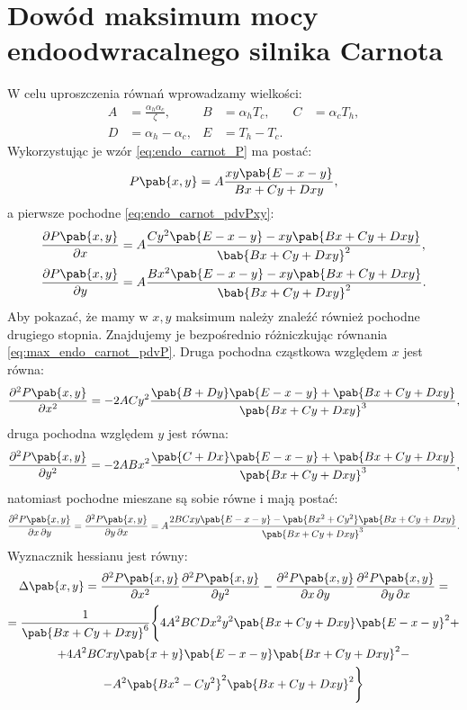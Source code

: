 
\section{Dowód maksimum mocy endoodwracalnego silnika Carnota}\label{sec:endo_carnot_max}
W celu uproszczenia równań wprowadzamy wielkości:
\begin{equation}\label{eq:max_endo_carnot_ABCDE}
\begin{aligned}
	A &= \frac{\alpha_{h}\alpha_{c}}{\zeta}, &
	B &= \alpha_{h}T_{c}, &
	C &= \alpha_{c}T_{h}, \\
	D &= \alpha_{h} - \alpha_{c}, &
	E &= T_{h} - T_{c}. &&
\end{aligned}
\end{equation}
Wykorzystując je wzór \eqref{eq:endo_carnot_P} ma postać:
\begin{equation}
	P\pab{x,y} = A \frac{xy\pab{E-x-y}}{Bx+Cy+Dxy},
\end{equation}
a pierwsze pochodne \eqref{eq:endo_carnot_pdvPxy}:
\begin{align}\label{eq:max_endo_carnot_pdvP}
	\pdv{P\pab{x,y}}{x} &= A \frac{Cy^2\pab{E-x-y} - xy\pab{Bx+Cy+Dxy}}{\bab{Bx+Cy+Dxy}^2}, \\
	\pdv{P\pab{x,y}}{y} &= A \frac{Bx^2\pab{E-x-y} - xy\pab{Bx+Cy+Dxy}}{\bab{Bx+Cy+Dxy}^2}.
\end{align}
Aby pokazać, że mamy w \(x,y\) maksimum należy znaleźć również pochodne drugiego stopnia. Znajdujemy je bezpośrednio różniczkując równania \eqref{eq:max_endo_carnot_pdvP}. Druga pochodna cząstkowa względem \(x\) jest równa:
\begin{equation}\label{eq:max_endo_carnot_pdvxx}
	\pdv[order=2]{P\pab{x,y}}{x} = -2ACy^2 \frac{
	\pab{B+Dy}\pab{E-x-y} + \pab{Bx+Cy+Dxy}
	}{\pab{Bx+Cy+Dxy}^3},
\end{equation}
druga pochodna względem \(y\) jest równa:
\begin{equation}\label{eq:max_endo_carnot_pdvyy}
	\pdv[order=2]{P\pab{x,y}}{y} = -2ABx^2 \frac{
	\pab{C+Dx}\pab{E-x-y} + \pab{Bx+Cy+Dxy}
	}{\pab{Bx+Cy+Dxy}^3},
\end{equation}
natomiast pochodne mieszane są sobie równe i mają postać:
\begin{equation}\label{eq:max_endo_carnot_pdvxy}
	\pdv{P\pab{x,y}}{x,y} = \pdv{P\pab{x,y}}{y,x} =
	A\frac{2BCxy\pab{E-x-y} - \pab{Bx^2 + Cy^2}\pab{Bx+Cy+Dxy}}{\pab{Bx+Cy+Dxy}^3}.
\end{equation}
Wyznacznik hessianu jest równy:
\begin{multline}
	\Delta\pab{x,y} = \pdv[order=2]{P\pab{x,y}}{x}\pdv[order=2]{P\pab{x,y}}{y} - \pdv{P\pab{x,y}}{x,y}\pdv{P\pab{x,y}}{y,x} = \\ =
	\inv{\pab{Bx+Cy+Dxy}^6} \Biggl\{
	4A^2BCDx^2y^2 \pab{Bx+Cy+Dxy}\pab{E-x-y}^2 + \\ +
	4A^2BCxy \pab{x+y}\pab{E-x-y}\pab{Bx+Cy+Dxy}^2 - \\ -
	A^2\pab{Bx^2-Cy^2}^2\pab{Bx+Cy+Dxy}^2
	\Biggr\}
\end{multline}

